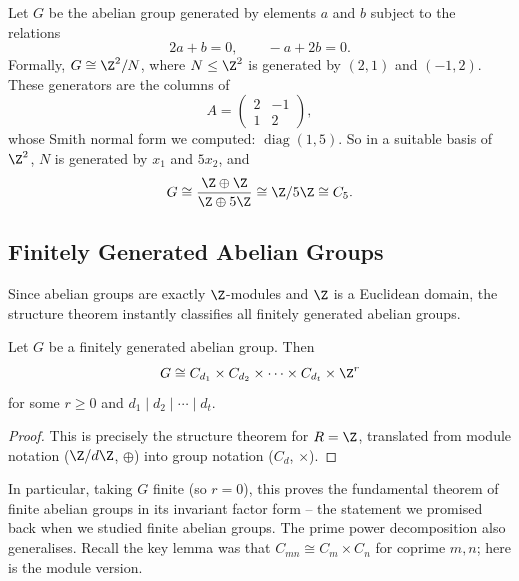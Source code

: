 \begin{example}
	Let $G$ be the abelian group generated by elements $a$ and $b$ subject to the relations
	$$
	2a + b = 0, \qquad -a + 2b = 0.
	$$
	Formally, $G \cong \Z^2/N$, where $N \leq \Z^2$ is generated by $(2, 1)$ and $(-1, 2)$. These generators are the columns of
	$$
	A = \begin{pmatrix} 2 & -1 \\ 1 & 2 \end{pmatrix},
	$$
	whose Smith normal form we computed: $\operatorname{diag}(1, 5)$. So in a suitable basis of $\Z^2$, $N$ is generated by $x_1$ and $5x_2$, and
	$$
	G \cong \frac{\Z \oplus \Z}{\Z \oplus 5\Z} \cong \Z/5\Z \cong C_5.
	$$
\end{example}

\subsection{Finitely Generated Abelian Groups}

Since abelian groups are exactly $\Z$-modules and $\Z$ is a Euclidean domain, the structure theorem instantly classifies all finitely generated abelian groups.

\begin{theorem}
	Let $G$ be a finitely generated abelian group. Then
	$$
	G \cong C_{d_1} \times C_{d_2} \times \cdots \times C_{d_t} \times \Z^r
	$$
	for some $r \geq 0$ and $d_1 \mid d_2 \mid \cdots \mid d_t$.
\end{theorem}
\begin{proof}
	This is precisely the structure theorem for $R = \Z$, translated from module notation ($\Z/d\Z$, $\oplus$) into group notation ($C_d$, $\times$).
\end{proof}

In particular, taking $G$ finite (so $r = 0$), this proves the fundamental theorem of finite abelian groups in its invariant factor form -- the statement we promised back when we studied finite abelian groups. The prime power decomposition also generalises. Recall the key lemma was that $C_{mn} \cong C_m \times C_n$ for coprime $m, n$; here is the module version.

